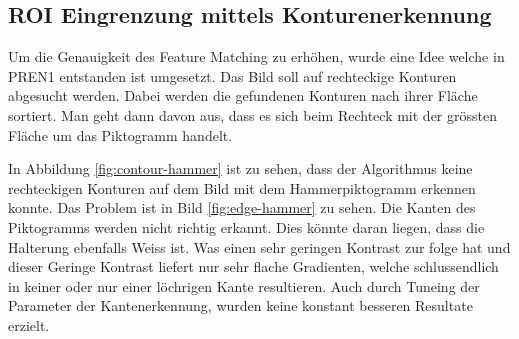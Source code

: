 \subsection{ROI Eingrenzung mittels Konturenerkennung}
Um die Genauigkeit des Feature Matching zu erhöhen, wurde eine Idee welche in PREN1 entstanden ist umgesetzt. Das Bild soll auf rechteckige Konturen abgesucht werden. Dabei werden die gefundenen Konturen nach ihrer Fläche sortiert. Man geht dann davon aus, dass es sich beim Rechteck mit der grössten Fläche um das Piktogramm handelt. 

In Abbildung \ref{fig:contour-hammer} ist zu sehen, dass der Algorithmus keine rechteckigen Konturen auf dem Bild mit dem Hammerpiktogramm erkennen konnte. Das Problem ist in Bild \ref{fig:edge-hammer} zu sehen. Die Kanten des Piktogramms werden nicht richtig erkannt. Dies könnte daran liegen, dass die Halterung ebenfalls Weiss ist. Was einen sehr geringen Kontrast zur folge hat und dieser Geringe Kontrast liefert nur sehr flache Gradienten, welche schlussendlich in keiner oder nur einer löchrigen Kante resultieren. Auch durch Tuneing der Parameter der Kantenerkennung, wurden keine konstant besseren Resultate erzielt.

